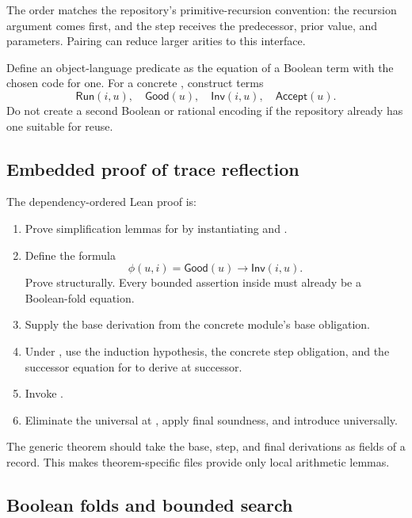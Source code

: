The order matches the repository's primitive-recursion convention: the
recursion argument comes first, and the step receives the predecessor, prior
value, and parameters.  Pairing can reduce larger arities to this interface.

Define an object-language predicate  as the equation of a
Boolean term with the chosen code for one.  For a concrete , construct
terms
\[
 \mathsf{Run}(i,u),\quad \mathsf{Good}(u),\quad
 \mathsf{Inv}(i,u),\quad \mathsf{Accept}(u).
\]
Do not create a second Boolean or rational encoding if the repository already
has one suitable for reuse.

\subsection{Embedded proof of trace reflection}

The dependency-ordered Lean proof is:

\begin{enumerate}
\item Prove simplification lemmas for  by instantiating
       and .
\item Define the formula
\[
 \phi(u,i)=\mathsf{Good}(u)\to\mathsf{Inv}(i,u).
\]
      Prove  structurally.  Every bounded assertion inside
       must already be a Boolean-fold equation.
\item Supply the base derivation from the concrete module's base obligation.
\item Under , use the induction hypothesis,
      the concrete step obligation, and the successor equation for
       to derive  at successor.
\item Invoke .
\item Eliminate the universal at , apply final soundness, and
      introduce  universally.
\end{enumerate}

The generic theorem should take the base, step, and final derivations as fields
of a record.  This makes theorem-specific files provide only local arithmetic
lemmas.

\subsection{Boolean folds and bounded search}

